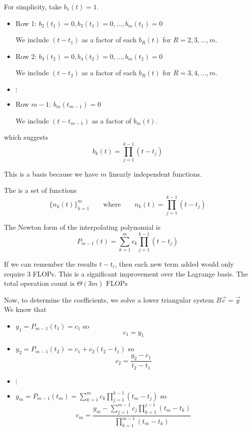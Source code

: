 For simplicity, take \( b_1(t) = 1 \).
\begin{itemize}
    \item Row 1: \( b_2(t_1) = 0, b_3(t_1) = 0, \ldots, b_m(t_1) = 0 \)

          We include \( (t - t_1) \) as a factor of each \( b_R(t) \) for \( R = 2, 3, \ldots, m \).

    \item Row 2: \( b_3(t_2) = 0, b_4(t_2) = 0, \ldots, b_m(t_2) = 0 \)

          We include \( (t - t_2) \) as a factor of each \( b_R(t) \) for \( R = 3, 4, \ldots, m \).

    \item \( \vdots \)

    \item Row \( m-1 \): \( b_m(t_{m-1}) = 0 \)

          We include \( (t - t_{m-1}) \) as a factor of \( b_m(t) \).
\end{itemize} which suggests \[
    b_k(t) = \prod_{j=1}^{k-1} (t - t_j)
\]

\begin{remark}
    This is a basis because we have \( m \) linearly independent functions.
\end{remark}

\begin{definition}
    The  is a set of functions \[
        \{ n_k(t) \}_{k=1}^{m} \qquad \text{where} \qquad n_k(t) = \prod_{j=1}^{k-1} (t - t_j)
    \]
\end{definition}

The Newton form of the interpolating polynomial is \[
    P_{m-1}(t) = \sum_{k=1}^{m} c_k \prod_{j=1}^{k-1} (t - t_j)
\]

\begin{remark}
    If we can remember the results \( t - t_i \), then each new term added would only require \( 3 \) FLOPs. This is a significant improvement over the Lagrange basis. The total operation count is \(
    \Theta(3m) \text{ FLOPs}
    \)
\end{remark}

Now, to determine the coefficients, we solve a lower triangular system \( B\vec{c} = \vec{y} \)
We know that
\begin{itemize}
    \item \( y_1 = P_{m-1}(t_1) = c_1 \) so \[
              c_1 = y_1
          \]
    \item \( y_2 = P_{m-1}(t_2) = c_1 + c_2(t_2 - t_1) \) so \[
              c_2 = \frac{y_2 - c_1}{t_2 - t_1}
          \]
    \item \( \vdots \)
    \item \( \displaystyle y_m = P_{m-1}(t_m) = \sum_{k=1}^{m} c_k \prod_{j=1}^{k-1} (t_m - t_j) \) so \[
              c_m = \frac{\displaystyle y_m - \sum_{j=1}^{m-1} c_j \prod_{k=1}^{j-1} (t_m - t_k)}{\displaystyle \prod_{k=1}^{m-1} (t_m - t_k)}
          \]
\end{itemize}

